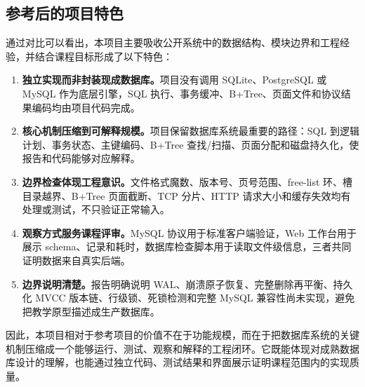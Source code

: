 \documentclass[UTF8,a4paper,12pt]{ctexart}
\begin{document}
\subsection{参考后的项目特色}

通过对比可以看出，本项目主要吸收公开系统中的数据结构、模块边界和工程经验，并结合课程目标形成了以下特色：

\begin{enumerate}[label=\arabic*.]
\item \textbf{独立实现而非封装现成数据库。}项目没有调用 SQLite、PostgreSQL 或 MySQL 作为底层引擎，SQL 执行、事务缓冲、B+Tree、页面文件和协议结果编码均由项目代码完成。
\item \textbf{核心机制压缩到可解释规模。}项目保留数据库系统最重要的路径：SQL 到逻辑计划、事务状态、主键编码、B+Tree 查找/扫描、页面分配和磁盘持久化，使报告和代码能够对应解释。
\item \textbf{边界检查体现工程意识。}文件格式魔数、版本号、页号范围、free-list 环、槽目录越界、B+Tree 页面截断、TCP 分片、HTTP 请求大小和缓存失效均有处理或测试，不只验证正常输入。
\item \textbf{观察方式服务课程评审。}MySQL 协议用于标准客户端验证，Web 工作台用于展示 schema、记录和耗时，数据库检查脚本用于读取文件级信息，三者共同证明数据来自真实后端。
\item \textbf{边界说明清楚。}报告明确说明 WAL、崩溃原子恢复、完整删除再平衡、持久化 MVCC 版本链、行级锁、死锁检测和完整 MySQL 兼容性尚未实现，避免把教学原型描述成生产数据库。
\end{enumerate}

因此，本项目相对于参考项目的价值不在于功能规模，而在于把数据库系统的关键机制压缩成一个能够运行、测试、观察和解释的工程闭环。它既能体现对成熟数据库设计的理解，也能通过独立代码、测试结果和界面展示证明课程范围内的实现质量。
\end{document}
